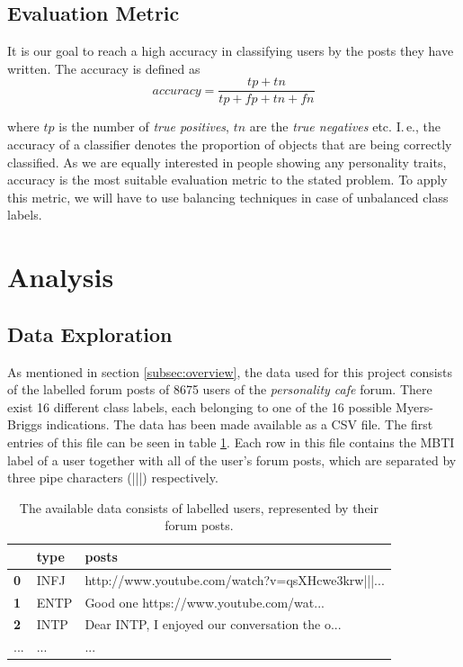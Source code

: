 \documentclass[12pt]{elsarticle}
\begin{document}
\subsection{Evaluation Metric}
It is our goal to reach a high accuracy in classifying users by the posts they have written. The accuracy is defined as 
\begin{equation}
\nonumber accuracy = \frac{tp + tn}{tp + fp + tn + fn}
\end{equation}

where $tp$ is the number of \textit{true positives}, $tn$ are the \textit{true negatives} etc. I.\,e., the accuracy of a classifier denotes the proportion of objects that are being correctly classified. As we are equally interested in people showing any personality traits, accuracy is the most suitable evaluation metric to the stated problem. To apply this metric, we will have to use balancing techniques in case of unbalanced class labels.


\section{Analysis}
\subsection{Data Exploration}
\label{subsec:exploration}
As mentioned in section \ref{subsec:overview}, the data used for this project consists of the labelled forum posts of 8675 users of the \textit{personality cafe} forum. There exist 16 different class labels, each belonging to one of the 16 possible Myers-Briggs indications. The data has been made available as a CSV file. The first entries of this file can be seen in table \ref{tab:data}. Each row in this file contains the MBTI label of a user together with all of the user's forum posts, which are separated by three pipe characters (|||) respectively. 






\begin{table}[ht]
\centering
\begin{tabular}{| l |l |l |}
\hline
   & \textbf{type} & \textbf{posts} \\
  \hline
  \textbf{0} & INFJ & http://www.youtube.com/watch?v=qsXHcwe3krw|||... \\
  \hline
  \textbf{1} & ENTP & Good one https://www.youtube.com/wat... \\
  \hline
  \textbf{2} & INTP & Dear INTP, I enjoyed our conversation the o... \\
  \hline
  ... & ... & ... \\
  \hline
\end{tabular}
\caption{The available data consists of labelled users, represented by their forum posts.}
\label{tab:data}
\end{table}
\end{document}

